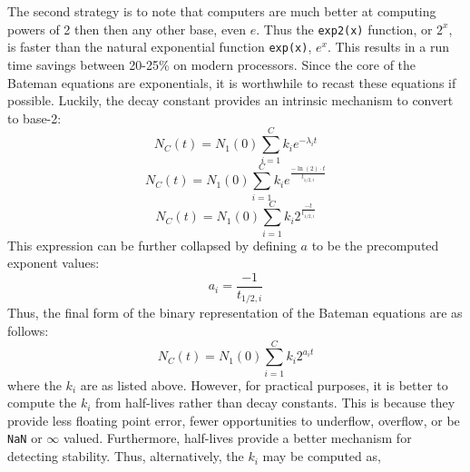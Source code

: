 \documentclass[letterpaper]{physor2018}
\begin{document}
The second strategy is to note that computers are much better at computing powers of
2 then then any other base, even $e$. Thus the \texttt{exp2(x)} function, or $2^x$,
is faster than the natural exponential function \texttt{exp(x)}, $e^x$.
This results in a run time savings between 20-25\% on modern processors.
Since the core of the Bateman equations
are exponentials, it is worthwhile to recast these equations if possible. Luckily, the decay constant
provides an intrinsic mechanism to convert to base-2:
\begin{equation}
\label{n-base-2-0}
    N_C(t) = N_1(0) \sum_{i=1}^C k_{i} e^{-\lambda_i t}
\end{equation}
\begin{equation}
\label{n-base-2-1}
    N_C(t) = N_1(0) \sum_{i=1}^C k_{i} e^{\frac{-\ln(2)\cdot t}{t_{1/2,i}}}
\end{equation}
\begin{equation}
\label{n-base-1}
    N_C(t) = N_1(0) \sum_{i=1}^C k_{i} 2^{\frac{-t}{t_{1/2,i}}}
\end{equation}
This expression can be further collapsed by defining $a$ to be the precomputed
exponent values:
\begin{equation}
\label{a-def}
    a_i = \frac{-1}{t_{1/2,i}}
\end{equation}
Thus, the final form of the binary representation of the Bateman equations are
as follows:
\begin{equation}
\label{final-form-a}
    N_C(t) = N_1(0) \sum_{i=1}^C k_{i} 2^{a_i t}
\end{equation}
where the $k_i$ are as listed above.  However, for practical purposes, it is better to
compute the $k_i$ from half-lives rather than decay constants.  This is because they
provide less floating point error, fewer opportunities to underflow, overflow, or be \texttt{NaN} or
$\infty$ valued. Furthermore, half-lives provide a better mechanism for detecting stability.
Thus, alternatively, the $k_i$ may be computed as,
\end{document}
